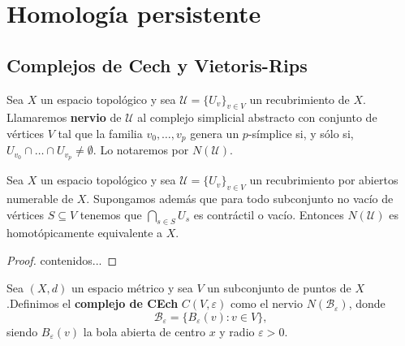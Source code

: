 
\chapter{Homología persistente}

\section{Complejos de Cech y Vietoris-Rips}
\begin{definicion}
	Sea $X$ un espacio topológico y sea $\mathcal{U} = \{U_v\}_{v \in V}$ un recubrimiento de $X$. Llamaremos \textbf{nervio} de $\mathcal{U}$ al complejo simplicial abstracto con conjunto de vértices $V$ tal que la familia $v_0, \dots, v_p$ genera un $p$-símplice si, y sólo si, $U_{v_0} \cap \dots \cap U_{v_p} \neq \emptyset$. Lo notaremos por $N(\mathcal{U})$.
\end{definicion}

\begin{teorema}
	Sea $X$ un espacio topológico y sea $\mathcal{U} = \{U_v\}_{v \in V}$ un recubrimiento por abiertos numerable de $X$. Supongamos además que para todo subconjunto no vacío de vértices $S \subseteq V$ tenemos que $\bigcap_{s \in S} U_s$ es contráctil o vacío. Entonces $N(\mathcal{U})$ es homotópicamente equivalente a $X$.
\end{teorema}
\begin{proof}
	contenidos...
\end{proof}
\begin{definicion}
	Sea $(X,d)$ un espacio métrico y sea $V$ un subconjunto de puntos de $X$.Definimos el \textbf{complejo de CEch} $C(V, \varepsilon)$ como el nervio $N(\mathcal{B}_\varepsilon)$, donde
	\[
		\mathcal{B}_\varepsilon = \{ B_{\varepsilon}(v) : v \in V \},
	\]
	siendo $B_{\varepsilon}(v)$ la bola abierta de centro $x$ y radio $\varepsilon > 0$.
\end{definicion}


